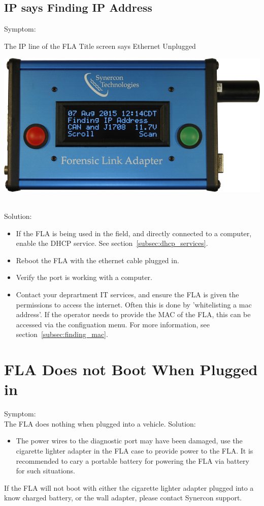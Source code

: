 \documentclass[11pt, oneside]{book}
\begin{document}
\subsection{IP says Finding IP Address}
Symptom:\\
\noindent\begin{minipage}{0.45\textwidth}%
The IP line of the FLA Title screen says Ethernet Unplugged
\end{minipage}%
\hfill%
\begin{minipage}{0.45\textwidth}
\includegraphics[width=\linewidth]{../media/fla_screens/no_ethernet/title_both_finding_ip}
\end{minipage}\\
Solution:\\
\begin{itemize}
\item If the FLA is being used in the field, and directly connected to a computer, enable the DHCP service. See section~\ref{subsec:dhcp_services}.
\item Reboot the FLA with the ethernet cable plugged in.
\item Verify the port is working with a computer.
\item Contact your deprartment IT services, and ensure the FLA is given the permissions to access the internet. Often this is done by 'whitelisting a mac address'. If the operator needs to provide the MAC of the FLA, this can be accessed via the configuation menu. For more information, see section~\ref{subsec:finding_mac}.
\end{itemize}
\section{FLA Does not Boot When Plugged in}
Symptom:\\
The FLA does nothing when plugged into a vehicle.
Solution:\\
\begin{itemize}
\item The power wires to the diagnostic port may have been damaged, use the cigarette lighter adapter in the FLA case to provide power to the FLA. It is recommended to cary a portable battery for powering the FLA via battery for such situations.
\end{itemize}
If the FLA will not boot with either the cigarette lighter adapter plugged into a know charged battery, or the wall adapter, please contact Synercon support.
\end{document}
